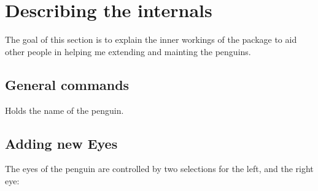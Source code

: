 \documentclass[parskip=half,english,numbers=noenddot,footnotes=nomultiple,oneside]{scrartcl}
\makeatletter
\def\explaincolor{@opcolor!8!white}
\def\keyexplainindent{2.5em}%
\let\@labelhack\@empty
\newenvironment{commandexplain}[1]{%
\begingroup
\def\@labelhack{/pingu/}%
\def\explaincolor{@softexplaincolor}\def\keyexplainindent{0em}%
\keyexplain[]{\\#1}{}{}%
}{\endkeyexplain\endgroup}
\makeatother
\begin{document}



\newcommand\includecode[2][../tex/tikzpingus.sty]{}

\section{Describing the internals}
The goal of this section is to explain the inner workings of the package to aid other people in helping me extending and mainting the penguins.

\subsection{General commands}

\begin{commandexplain}{pingu@name}
	Holds the name of the penguin.
\end{commandexplain}

\subsection{Adding new Eyes}
The eyes of the penguin are controlled by two selections for the left, and the right eye:
\includecode{eyes\ selectors}


\lstset{breakatwhitespace}\printindex
\end{document}
